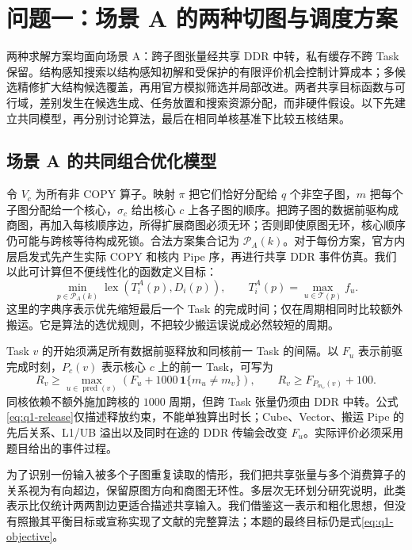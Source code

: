 \section{问题一：场景 A 的两种切图与调度方案}
两种求解方案均面向场景 A：跨子图张量经共享 DDR 中转，私有缓存不跨 Task 保留。结构感知搜索以结构感知初解和受保护的有限评价机会控制计算成本；多候选精修扩大结构候选覆盖，再用官方模拟筛选并局部改进。两者共享目标函数与可行域，差别发生在候选生成、任务放置和搜索资源分配，而非硬件假设。以下先建立共同模型，再分别讨论算法，最后在相同单核基准下比较五核结果。
\subsection{场景 A 的共同组合优化模型}
令 $V_c$ 为所有非 COPY 算子。映射 $\pi$ 把它们恰好分配给 $q$ 个非空子图，$m$ 把每个子图分配给一个核心，$\sigma_c$ 给出核心 $c$ 上各子图的顺序。把跨子图的数据前驱构成商图，再加入每核顺序边，所得扩展商图必须无环；否则即使原图无环，核心顺序仍可能与跨核等待构成死锁。合法方案集合记为 $\mathcal P_A(k)$。对于每份方案，官方内层启发式先产生实际 COPY 和核内 Pipe 序，再进行共享 DDR 事件仿真。我们以此可计算但不便线性化的函数定义目标：
\begin{equation}\label{eq:q1-objective}
\min_{p\in\mathcal P_A(k)}
\operatorname{lex}\left(T_i^A(p),D_i(p)\right),\qquad
T_i^A(p)=\max_{u\in\mathcal T(p)}f_u .
\end{equation}
这里的字典序表示优先缩短最后一个 Task 的完成时间；仅在周期相同时比较额外搬运。它是算法的选优规则，不把较少搬运误说成必然较短的周期。

Task $v$ 的开始须满足所有数据前驱释放和同核前一 Task 的间隔。以 $F_u$ 表示前驱完成时刻，$P_c(v)$ 表示核心 $c$ 上的前一 Task，可写为
\begin{equation}\label{eq:q1-release}
R_v \ge \max_{u\in\operatorname{pred}(v)}
\left(F_u+1000\,\mathbf 1\{m_u\ne m_v\}\right),\qquad
R_v\ge F_{P_{m_v}(v)}+100 .
\end{equation}
同核依赖不额外施加跨核的 $1000$ 周期，但跨 Task 张量仍须由 DDR 中转。公式\eqref{eq:q1-release}仅描述释放约束，不能单独算出时长；Cube、Vector、搬运 Pipe 的先后关系、L1/UB 溢出以及同时在途的 DDR 传输会改变 $F_u$。实际评价必须采用题目给出的事件过程。

为了识别一份输入被多个子图重复读取的情形，我们把共享张量与多个消费算子的关系视为有向超边，保留原图方向和商图无环性。多层次无环划分研究说明，此类表示比仅统计两两割边更适合描述共享输入\cite{popp}。我们借鉴这一表示和粗化思想，但没有照搬其平衡目标或宣称实现了文献的完整算法；本题的最终目标仍是式\eqref{eq:q1-objective}。

